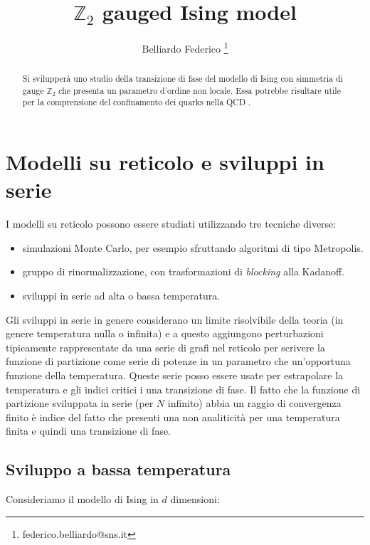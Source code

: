 \documentclass[12pt,a4paper]{article}
\author{Belliardo Federico \footnote{federico.belliardo@sns.it}}
\title{$\mathbb{Z}_2$ gauged Ising model}
\begin{document}
\maketitle

\tableofcontents


\begin{abstract}
Si svilupperà uno studio della transizione di fase del modello di Ising con simmetria di gauge $\mathbb{Z}_2$ che presenta un parametro d'ordine non locale. Essa potrebbe risultare utile per la comprensione del confinamento dei quarks nella QCD .
\end{abstract}


\section{Modelli su reticolo e sviluppi in serie}
I modelli su reticolo possono essere studiati utilizzando tre tecniche diverse:

\begin{itemize}
\item simulazioni Monte Carlo, per esempio sfruttando algoritmi di tipo Metropolis.
\item gruppo di rinormalizzazione, con trasformazioni di \emph{blocking} alla Kadanoff.
\item sviluppi in serie ad alta o bassa temperatura.
\end{itemize}

Gli sviluppi in serie in genere considerano un limite risolvibile della teoria (in genere temperatura nulla o infinita) e a questo aggiungono perturbazioni tipicamente rappresentate da una serie di grafi nel reticolo per scrivere la funzione di partizione come serie di potenze in un parametro che  un'opportuna funzione della temperatura. Queste serie posso essere usate per estrapolare la temperatura e gli indici critici i una transizione di fase.
Il fatto che la funzione di partizione sviluppata in serie (per $N$ infinito) abbia un raggio di convergenza finito è indice del fatto che presenti una non analiticità per una temperatura finita e quindi una transizione di fase.
\subsection{Sviluppo a bassa temperatura}
Consideriamo il modello di Ising in $d$ dimensioni:
\end{document}
